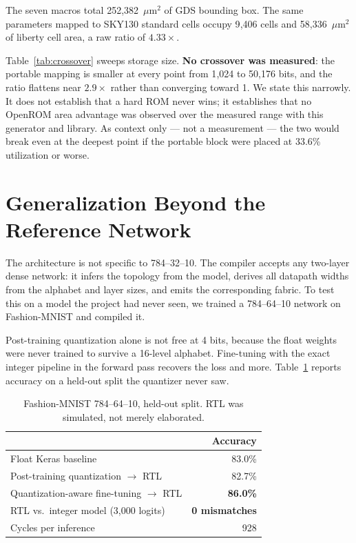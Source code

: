 \documentclass[conference]{IEEEtran}
\begin{document}
The seven macros total 252{,}382~$\mu$m$^2$ of GDS bounding box. The same
parameters mapped to SKY130 standard cells occupy 9{,}406 cells and
58{,}336~$\mu$m$^2$ of liberty cell area, a raw ratio of $4.33\times$.

Table~\ref{tab:crossover} sweeps storage size. \textbf{No crossover was
measured}: the portable mapping is smaller at every point from 1{,}024 to
50{,}176 bits, and the ratio flattens near $2.9\times$ rather than converging
toward 1. We state this narrowly. It does not establish that a hard ROM never
wins; it establishes that no OpenROM area advantage was observed over the
measured range with this generator and library. As context only --- not a
measurement --- the two would break even at the deepest point if the portable
block were placed at 33.6\% utilization or worse.

\section{Generalization Beyond the Reference Network}

The architecture is not specific to 784--32--10. The compiler accepts any
two-layer dense network: it infers the topology from the model, derives all
datapath widths from the alphabet and layer sizes, and emits the corresponding
fabric. To test this on a model the project had never seen, we trained a
784--64--10 network on Fashion-MNIST and compiled it.

Post-training quantization alone is not free at 4 bits, because the float
weights were never trained to survive a 16-level alphabet. Fine-tuning with the
exact integer pipeline in the forward pass recovers the loss and more.
Table~\ref{tab:fashion} reports accuracy on a held-out split the quantizer never
saw.

\begin{table}[h]
\centering
\caption{Fashion-MNIST 784--64--10, held-out split. RTL was simulated, not
merely elaborated.}
\label{tab:fashion}
\footnotesize
\begin{tabular}{@{}lr@{}}
\toprule
& Accuracy \\
\midrule
Float Keras baseline & 83.0\% \\
Post-training quantization $\rightarrow$ RTL & 82.7\% \\
Quantization-aware fine-tuning $\rightarrow$ RTL & \textbf{86.0\%} \\
\midrule
RTL vs.\ integer model (3{,}000 logits) & \textbf{0 mismatches} \\
Cycles per inference & 928 \\
\bottomrule
\end{tabular}
\end{table}
\end{document}

